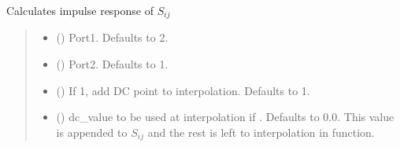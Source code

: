 \documentclass[letterpaper,10pt,english]{sphinxmanual}
\begin{document}
\begin{fulllineitems}
\begin{fulllineitems}
\label{\detokenize{touchstone:touchstone.spfile.ImpulseResponse}}
\pysigstartsignatures
{}
\pysigstopsignatures
\sphinxAtStartPar
Calculates impulse response of \(S_{i j}\)
\begin{quote}\begin{description}
\begin{itemize}
\item {} 
\sphinxAtStartPar
{} (\sphinxstyleliteralemphasis{\sphinxupquote{, }}) \textendash{} Port\sphinxhyphen{}1. Defaults to 2.

\item {} 
\sphinxAtStartPar
{} (\sphinxstyleliteralemphasis{\sphinxupquote{, }}) \textendash{} Port\sphinxhyphen{}2. Defaults to 1.

\item {} 
\sphinxAtStartPar
{} (\sphinxstyleliteralemphasis{\sphinxupquote{, }}) \textendash{} If 1, add DC point to interpolation. Defaults to 1.

\item {} 
\sphinxAtStartPar
{} (\sphinxstyleliteralemphasis{\sphinxupquote{, }}) \textendash{} dc\_value to be used at interpolation if . Defaults to 0.0. This value is appended to \(S_{i j}\) and the rest is left to interpolation in  function.


\end{itemize}
\end{description}
\end{quote}
\end{fulllineitems}
\end{fulllineitems}
\end{document}
